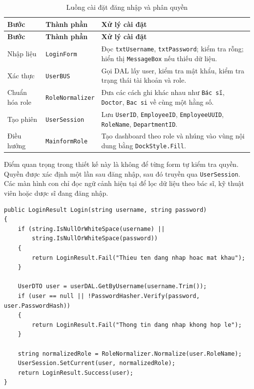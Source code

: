 \documentclass[12pt,a4paper]{article}
\numberwithin{figure}{subsection}
\numberwithin{table}{subsection}
\newcounter{codecounter}
\newenvironment{codeblock}[2]{%
    \refstepcounter{codecounter}%
    \phantomsection%
    \label{#1}%
    \par\smallskip
}{%
    \par\smallskip
}
\begin{document}
\begin{longtable}{|p{3.2cm}|p{4.6cm}|p{6cm}|}
\caption{Luồng cài đặt đăng nhập và phân quyền} \\
\hline
\textbf{Bước} & \textbf{Thành phần} & \textbf{Xử lý cài đặt} \\
\hline
\endfirsthead
\hline
\textbf{Bước} & \textbf{Thành phần} & \textbf{Xử lý cài đặt} \\
\hline
\endhead
Nhập liệu & \texttt{LoginForm} & Đọc \texttt{txtUsername}, \texttt{txtPassword}; kiểm tra rỗng; hiển thị \texttt{MessageBox} nếu thiếu dữ liệu. \\
\hline
Xác thực & \texttt{UserBUS} & Gọi DAL lấy user, kiểm tra mật khẩu, kiểm tra trạng thái tài khoản và role. \\
\hline
Chuẩn hóa role & \texttt{RoleNormalizer} & Đưa các cách ghi khác nhau như \texttt{Bác sĩ}, \texttt{Doctor}, \texttt{Bac si} về cùng một hằng số. \\
\hline
Tạo phiên & \texttt{UserSession} & Lưu \texttt{UserID}, \texttt{EmployeeID}, \texttt{EmployeeUUID}, \texttt{RoleName}, \texttt{DepartmentID}. \\
\hline
Điều hướng & \texttt{MainformRole} & Tạo dashboard theo role và nhúng vào vùng nội dung bằng \texttt{DockStyle.Fill}. \\
\hline
\end{longtable}

Điểm quan trọng trong thiết kế này là không để từng form tự kiểm tra quyền. Quyền được xác định một lần sau đăng nhập, sau đó truyền qua \texttt{UserSession}. Các màn hình con chỉ đọc ngữ cảnh hiện tại để lọc dữ liệu theo bác sĩ, kỹ thuật viên hoặc dược sĩ đang đăng nhập.

\begin{codeblock}{code:auth-flow-bus}{Mô phỏng luồng xác thực ở tầng BUS}
\begin{verbatim}
public LoginResult Login(string username, string password)
{
    if (string.IsNullOrWhiteSpace(username) ||
        string.IsNullOrWhiteSpace(password))
    {
        return LoginResult.Fail("Thieu ten dang nhap hoac mat khau");
    }

    UserDTO user = userDAL.GetByUsername(username.Trim());
    if (user == null || !PasswordHasher.Verify(password, user.PasswordHash))
    {
        return LoginResult.Fail("Thong tin dang nhap khong hop le");
    }

    string normalizedRole = RoleNormalizer.Normalize(user.RoleName);
    UserSession.SetCurrent(user, normalizedRole);
    return LoginResult.Success(user);
}
\end{verbatim}
\end{codeblock}
\end{document}

